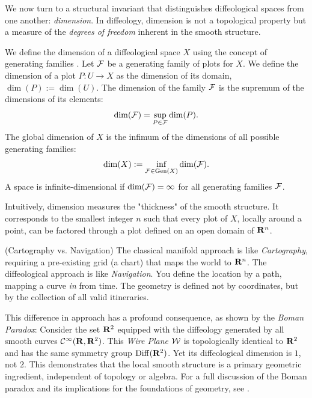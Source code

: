   \begin{article}
    \label{subsec:The Diffeological Dimension}
    
    We now turn to a structural invariant that distinguishes diffeological spaces from one another: \emph{dimension}.
    In diffeology,
    dimension is not a topological property but a measure of the \emph{degrees of freedom} inherent in the smooth structure.
    
    We define the dimension of a diffeological space $X$ using the concept of generating families \cite{PIZ06}.
    Let $\mathcal{F}$ be a generating family of plots for $X$.
    We define the dimension of a plot $P: U \to X$ as the dimension of its domain,
    $\dim(P) := \dim(U)$.
    The dimension of the family $\mathcal{F}$ is the supremum of the dimensions of its elements:
    \[
      \dim(\mathcal{F}) = \sup_{P \in \mathcal{F}} \dim(P).
      \]
    The global dimension of $X$ is the infimum of the dimensions of all possible generating families:
    \[
      \dim(X) := \inf_{\mathcal{F} \in \mathrm{Gen}(X)} \dim(\mathcal{F}).
      \]
    A space is infinite-dimensional if $\dim(\mathcal{F}) = \infty$ for all generating families $\mathcal{F}$.
    
    Intuitively,
    dimension measures the "thickness" of the smooth structure.
    It corresponds to the smallest integer $n$ such that every plot of $X$,
    locally around a point,
    can be factored through a plot defined on an open domain of ${\mathbf{R}}^n$.
    
    \begin{remark} \textup{(Cartography vs. Navigation)}
      \label{subsec:Cartography vs. Navigation}
      The classical manifold approach is like \emph{Cartography},
      requiring a pre-existing grid (a chart) that maps the world to ${\mathbf{R}}^n$.
      The diffeological approach is like \emph{Navigation}.
      You define the location by a path,
      mapping a curve \emph{in} from time.
      The geometry is defined not by coordinates,
      but by the collection of all valid itineraries.
      
      This difference in approach has a profound consequence,
      as shown by the \emph{Boman Paradox}:
      Consider the set ${\mathbf{R}}^2$ equipped with the diffeology generated by all smooth curves ${\mathcal{C}}^\infty({\mathbf{R}}, {\mathbf{R}}^2)$.
      This \emph{Wire Plane} $\mathcal{W}$ is topologically identical to ${\mathbf{R}}^2$ and has the same symmetry group $\operatorname{Diff}({\mathbf{R}}^2)$.
      Yet its diffeological dimension is $1$, not $2$.
      This demonstrates that the local smooth structure is a primary geometric ingredient,
      independent of topology or algebra.
      For a full discussion of the Boman paradox and its implications for the foundations of geometry,
      see \cite{PIZ25c}.
    \end{remark}
  \end{article}
  
